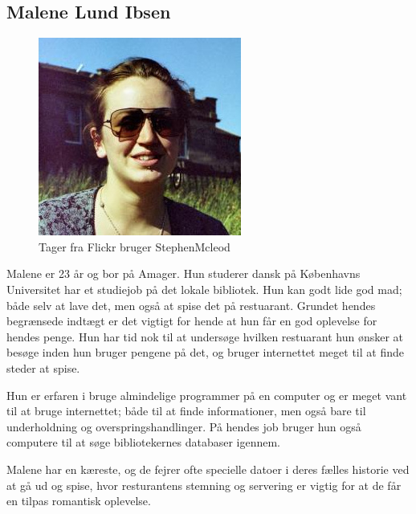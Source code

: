 \documentclass[a4paper, 12pt]{article}
\begin{document}
\subsection{Malene Lund Ibsen}

\begin{figure}
  \includegraphics[width=\linewidth]{marlene}\\
  {\scriptsize Tager fra Flickr bruger StephenMcleod}
\end{figure}

Malene er 23 år og bor på Amager. Hun studerer dansk på Københavns Universitet
har et studiejob på det lokale bibliotek. Hun kan godt lide god mad; både selv
at lave det, men også at spise det på restuarant. Grundet hendes begrænsede
indtægt er det vigtigt for hende at hun får en god oplevelse for hendes penge.
Hun har tid nok til at undersøge hvilken restuarant hun ønsker at besøge inden
hun bruger pengene på det, og bruger internettet meget til at finde steder at
spise.

Hun er erfaren i bruge almindelige programmer på en computer og er meget vant
til at bruge internettet; både til at finde informationer, men også bare til
underholdning og overspringshandlinger. På hendes job bruger hun også computere
til at søge bibliotekernes databaser igennem. 

Malene har en kæreste, og de fejrer ofte specielle datoer i deres fælles
historie ved at gå ud og spise, hvor resturantens stemning og servering er
vigtig for at de får en tilpas romantisk oplevelse.
\end{document}
